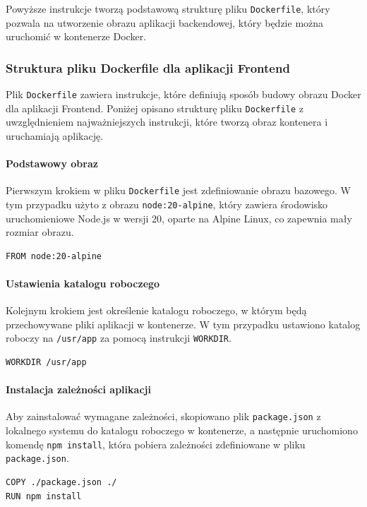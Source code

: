 Powyższe instrukcje tworzą podstawową strukturę pliku \texttt{Dockerfile}, który pozwala na utworzenie obrazu aplikacji backendowej, który będzie można uruchomić w kontenerze Docker.

\subsubsection{Struktura pliku Dockerfile dla aplikacji Frontend}

Plik \texttt{Dockerfile} zawiera instrukcje, które definiują sposób budowy obrazu Docker dla aplikacji Frontend. Poniżej opisano strukturę pliku \texttt{Dockerfile} z uwzględnieniem najważniejszych instrukcji, które tworzą obraz kontenera i uruchamiają aplikację.

\paragraph{Podstawowy obraz}
Pierwszym krokiem w pliku \texttt{Dockerfile} jest zdefiniowanie obrazu bazowego. W tym przypadku użyto z obrazu \texttt{node:20-alpine}, który zawiera środowisko uruchomieniowe Node.js w wersji 20, oparte na Alpine Linux, co zapewnia mały rozmiar obrazu.
\begin{lstlisting}[basicstyle=\footnotesize\ttfamily]
FROM node:20-alpine
\end{lstlisting}

\paragraph{Ustawienia katalogu roboczego}
Kolejnym krokiem jest określenie katalogu roboczego, w którym będą przechowywane pliki aplikacji w kontenerze. W tym przypadku ustawiono katalog roboczy na \texttt{/usr/app} za pomocą instrukcji \texttt{WORKDIR}.
\begin{lstlisting}[basicstyle=\footnotesize\ttfamily]
WORKDIR /usr/app
\end{lstlisting}

\paragraph{Instalacja zależności aplikacji}
Aby zainstalować wymagane zależności, skopiowano plik \texttt{package.json} z lokalnego systemu do katalogu roboczego w kontenerze, a następnie uruchomiono komendę \texttt{npm install}, która pobiera zależności zdefiniowane w pliku \texttt{package.json}.
\begin{lstlisting}[basicstyle=\footnotesize\ttfamily]
COPY ./package.json ./
RUN npm install
\end{lstlisting}

